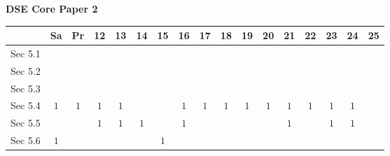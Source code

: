 \documentclass[12pt, a4paper]{article}
\begin{document}
\begin{absolutelynopagebreak}
\begin{center}
\textbf{DSE Core Paper 2}
\end{center}
\begin{center}
\begin{tabular}{|l|c|c|c|c|c|c|c|c|c|c|c|c|c|c|c|c|}
\hline
        & Sa & Pr & 12 & 13 & 14 & 15 & 16 & 17 & 18 & 19 & 20 & 21 & 22 & 23 & 24 & 25 \\\hline\hline
Sec 5.1 &  &  &  &  &  &  &  &  &  &  &  &  &  &  &  &  \\\hline
Sec 5.2 &  &  &  &  &  &  &  &  &  &  &  &  &  &  &  &  \\\hline
Sec 5.3 &  &  &  &  &  &  &  &  &  &  &  &  &  &  &  &  \\\hline
Sec 5.4 &  $1$ &  $1$ &  $1$ &  $1$ &  &  &  $1$ &  $1$ &  $1$ &  $1$ &  $1$ &  $1$ &  $1$ &  $1$ &  $1$ &  \\\hline
Sec 5.5 &  &  &  $1$ &  $1$ &  $1$ &  &  $1$ &  &  &  &  &  $1$ &  &  $1$ &  $1$ &  \\\hline
Sec 5.6 &  $1$ &  &  &  &  &  $1$ &  &  &  &  &  &  &  &  &  &  \\\hline
\end{tabular}
\end{center}
\end{absolutelynopagebreak}
\end{document}
